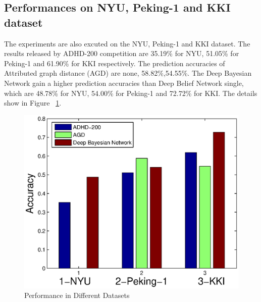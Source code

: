 \documentclass[10pt,twocolumn,letterpaper]{article}
\begin{document}
\subsection{Performances on NYU, Peking-1 and KKI dataset}
The experiments are also excuted on the NYU, Peking-1 and KKI dataset. The results released by ADHD-200 competition are 35.19\% for NYU, 51.05\% for Peking-1 and 61.90\% for KKI respectively. The prediction accuracies of Attributed graph distance\cite{19} (AGD) are none, 58.82\%,54.55\%. The Deep Bayesian Network  gain a higher prediction accuracies than Deep Belief Network single, which are 48.78\% for NYU, 54.00\% for Peking-1 and 72.72\% for KKI. The details show in Figure ~\ref{fig:dataset}.
\begin{figure}[ht]
\begin{center}
   \includegraphics[width=0.7\linewidth]{Datasets.eps}
\end{center}
   \caption{Performance in Different Datasets}
\label{fig:dataset}
\end{figure}
\end{document}
